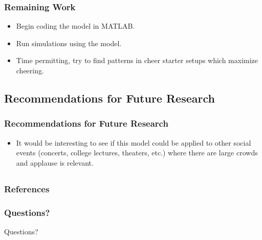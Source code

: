 \documentclass[compress,handout,10pt]{beamer}
\let\olditem\item
\renewcommand{\item}{\setlength{\itemsep}{0.5\baselineskip}\olditem}
\begin{document}
\begin{frame}
	\frametitle{Remaining Work}
	\begin {itemize}
		\item Begin coding the model in MATLAB.
		\item Run simulations using the model.
		\item Time permitting, try to find patterns in cheer starter setups which maximize cheering.
	\end {itemize}
\end{frame}

\subsection{Recommendations for Future Research}

\begin{frame}
	\frametitle {Recommendations for Future Research}
	\begin {itemize}
		\item It would be interesting to see if this model could be applied to other social events (concerts, college lectures, theaters, etc.) where there are large crowds and applause is relevant.
	\end {itemize}
\end{frame}

\subsection{}

\begin {frame}
	\frametitle{References}
	
	
\end {frame}

\begin{frame}
	\frametitle {Questions?}
	\begin{center}
		Questions?
	\end{center}
\end{frame}
\end{document}
